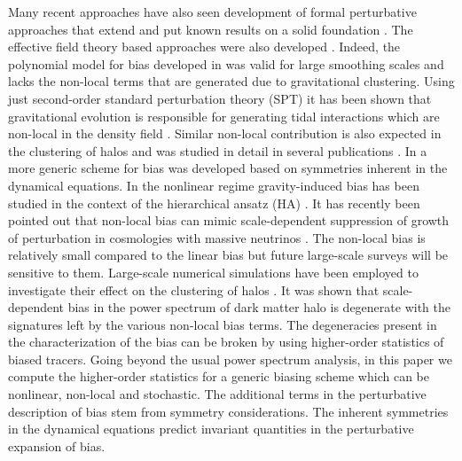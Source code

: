 Many recent approaches have also seen development of formal perturbative
approaches that extend and put known results on a solid foundation \citep{Matsubara,Carlson,Vlah}.   
The effective field theory based approaches were also developed \citep{Effective_bias,Angulo}.
Indeed, the polynomial model for bias developed in \citep{FryGaztanga} was valid for large smoothing scales 
and lacks the non-local terms that are generated due to gravitational clustering.
Using just second-order standard perturbation theory (SPT) it has been shown that gravitational
evolution is responsible for generating tidal interactions which are non-local in the density field \citep{Fry,Goroff,Bouchet}.
Similar non-local contribution is also expected in the clustering of halos and was studied in detail in several
publications \citep{Catelan1,Catelan2}. In \citep{Roy} a more generic scheme for bias was developed based on
symmetries inherent in the dynamical equations.  
In the nonlinear regime gravity-induced bias has been studied in the context of the
hierarchical ansatz (HA) \citep{bias_letter, BernardeauSchaeffer}.
It has recently been pointed out that non-local bias can mimic scale-dependent 
suppression of growth of perturbation in cosmologies with massive neutrinos  
\citep{Saito,Audren,Gong,Adreu,Beutler,Marlina}.
The non-local bias is relatively small compared to the linear bias
but future large-scale surveys will be sensitive to them.
Large-scale numerical simulations have been employed to investigate their
effect on the clustering of halos \citep{sim1,sim2,sim3, LoVerde}. It was shown that
scale-dependent bias in the power spectrum of dark matter halo is
degenerate with the signatures left by the various non-local bias terms.
The degeneracies present in the characterization of the bias can be broken by
using higher-order statistics of biased tracers. Going beyond the usual power spectrum analysis, 
in this paper we compute the higher-order statistics for a generic biasing scheme
which can be nonlinear, non-local and stochastic. The additional
terms in the perturbative description of bias stem from symmetry considerations.
The inherent symmetries in the dynamical
equations predict invariant quantities \citep{ChecnScocSheth,Baldauf,Kehagias} in the perturbative
expansion of bias. 


